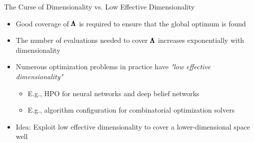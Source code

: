 \begin{frame}[c]{The Curse of Dimensionality vs. Low Effective Dimensionality}
\begin{itemize}
    \item Good coverage of $\pmb{\Lambda}$ is required to ensure that the global optimum is found
    \item The number of evaluations needed to cover $\pmb{\Lambda}$ increases exponentially with dimensionality
    \item Numerous optimization problems in practice have \emph{"low effective dimensionality"}
    \begin{itemize}
        \item E.g., HPO for neural networks and deep belief networks
        \item E.g., algorithm configuration for combinatorial optimization solvers 
    \end{itemize}
\pause
\medskip
    \item Idea: Exploit low effective dimensionality to cover a lower-dimensional space well
\end{itemize}

\end{frame}

